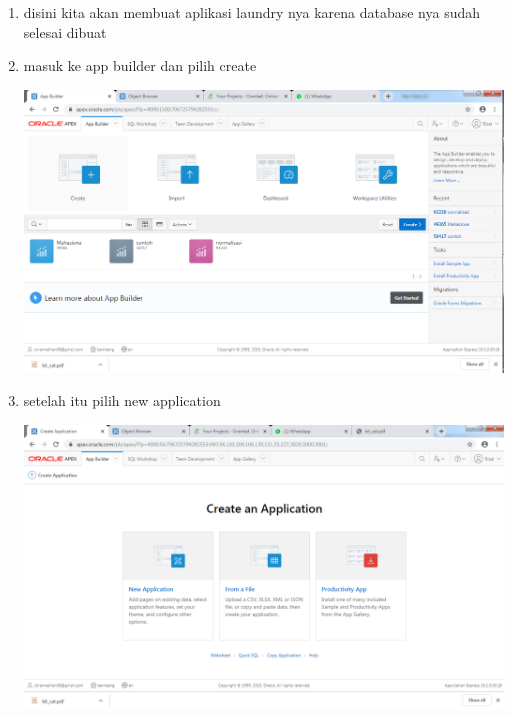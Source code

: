 \documentclass{article}
\begin{document}
\begin{enumerate}
\item disini kita akan membuat aplikasi laundry nya karena database nya sudah selesai dibuat
    
\item masuk ke app builder dan pilih create
    \begin{center}
         \centering
            \includegraphics[scale=0.27]{gambar/Capture9.PNG}
        \caption{}
        \label{excel}
    \end{center}

\item setelah itu pilih new application 
    \begin{center}
         \centering
            \includegraphics[scale=0.27]{gambar/Capture11.PNG}
        \caption{}
        \label{excel}
    \end{center}    


\end{enumerate}
\end{document}
